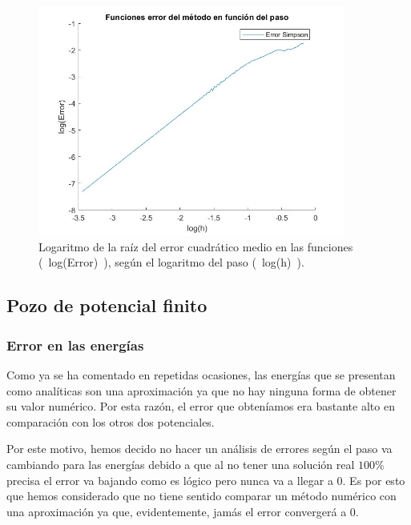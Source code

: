 \documentclass[12pt]{article}
\begin{document}
    \begin{figure}[H]
        \centering
        \includegraphics[width=0.9\textwidth]{errorfuncionsegunpasoN500log.jpg}
        \caption{Logaritmo de la raíz del error cuadrático medio en las funciones (~log(Error)~), según el  logaritmo del paso (~log(h)~).}
        \end{figure}  
\subsection{Pozo de potencial finito}
\subsubsection{Error en las energías}
Como ya se ha comentado en repetidas ocasiones, las energías 
que se presentan como analíticas son una aproximación ya que 
no hay ninguna forma de obtener su valor numérico. Por esta
razón, el error que obteníamos era bastante alto en comparación
con los otros dos potenciales. \\
\par
Por este motivo, hemos decido no hacer un análisis de errores
según el paso va cambiando para las energías debido a que al 
no tener una solución real $100\%$ precisa el error va bajando
como es lógico pero nunca va a llegar a 0. Es por esto que 
hemos considerado que no tiene sentido comparar un método numérico
con una aproximación ya que, evidentemente, jamás el error 
convergerá a 0.
\end{document}
